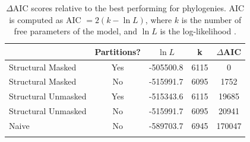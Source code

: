 \documentclass[fleqn,10pt]{wlpeerj}
\begin{document}
\vspace{3cm}

\begin{table}[htbp]
	\centering
	\begin{tabular}{l c l l c}
		\hline\noalign{\smallskip}
		\multicolumn{1}{c}{Alignment} & \multicolumn{1}{c}{Partitions?} & \multicolumn{1}{c}{$\ln L$} & \multicolumn{1}{c}{k} & \multicolumn{1}{l}{$\Delta$AIC} \\
		\hline\noalign{\smallskip}
		Structural Masked & Yes & -505500.8 & 6115 & 0 \\
		Structural Masked & No & -515991.7 & 6095 & 1752 \\  
		Structural Unmasked & Yes & -515343.6 & 6115 & 19685 \\
		Structural Unmasked & No & -515991.7 & 6095 & 20941 \\ 
		Naive & No &  -589703.7 & 6945 & 170047 \\
		\noalign{\smallskip}\hline\noalign{\smallskip} 
	\end{tabular}
	\caption{\label{tab:phylo_AIC} $\Delta$AIC scores relative to the best performing for phylogenies.  AIC is computed as AIC $= 2(k - \ln L)$, where $k$ is the number of free parameters of the model, and $\ln L$ is the log-likelihood \citep{Akaike1974,BurnhamAnderson2004}.}
\end{table}


\newpage
\end{document}
